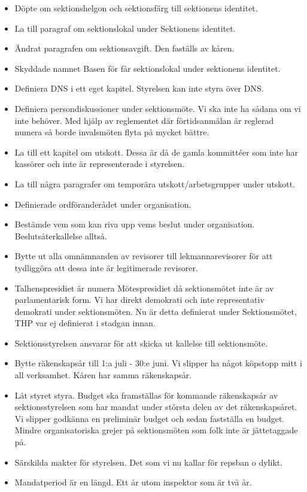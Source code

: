 \documentclass[a4paper]{dteklag}
\begin{document}
\begin{itemize}
  \item Döpte om sektionshelgon och sektionsfärg till sektionens identitet.
  \item La till paragraf om sektionslokal under Sektionens identitet.
  \item Ändrat paragrafen om sektionsavgift. Den faställs av kåren.
  \item Skyddade namnet Basen för får sektionslokal under sektionens identitet.
  \item Definiera DNS i ett eget kapitel. Styrelsen kan inte styra över DNS.
  \item Definiera persondiskussioner under sektionsmöte. Vi ska inte ha sådana om vi inte behöver. Med hjälp av reglementet där förtidsanmälan är reglerad numera så borde invalsmöten flyta på mycket bättre.
  \item La till ett kapitel om utskott. Dessa är då de gamla kommittéer som inte har kassörer och inte är representerade i styrelsen.
  \item La till några paragrafer om temporära utskott/arbetsgrupper under utskott.
  \item Definierade ordföranderådet under organisation.
  \item Bestämde vem som kan riva upp vems beslut under organisation. Beslutsåterkallelse alltså.
  \item Bytte ut alla omnämnanden av revisorer till lekmannarevisorer för att tydliggöra att dessa inte är legitimerade revisorer.
  \item Talhenspresidiet är numera Mötespresidiet då sektionsmötet inte är av parlamentarisk form. Vi har direkt demokrati och inte representativ demokrati under sektionsmöten. Nu är detta definierat under Sektionsmötet, THP var ej definierat i stadgan innan.
  \item Sektionsstyrelsen ansvarar för att skicka ut kallelse till sektionsmöte.
  \item Bytte räkenskapsår till 1:a juli - 30:e juni. Vi slipper ha något köpstopp mitt i all verksamhet. Kåren har samma räkenskapsår.
  \item Låt styret styra. Budget ska framställas för kommande räkenskapsår av sektionsstyrelsen som har mandat under största delen av det räkenskapsåret. Vi slipper godkänna en preliminär budget och sedan fastställa en budget. Mindre organisatoriska grejer på sektionsmöten som folk inte är jättetaggade på.
  \item Särskilda makter för styrelsen. Det som vi nu kallar för repsban o dylikt.
  \item Mandatperiod är en längd. Ett år utom inspektor som är två år.

\end{itemize}
\end{document}
